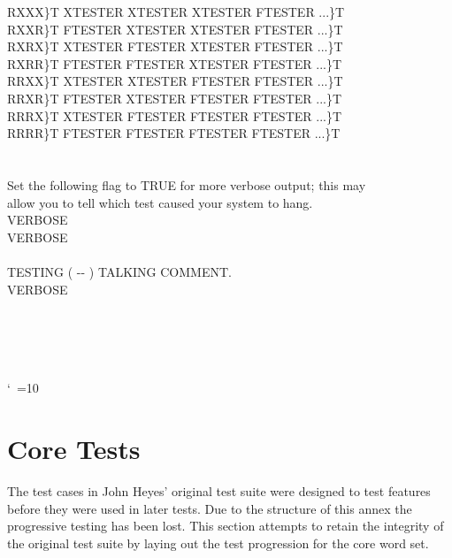 \begin{tt}
\tab \word{:} RXXX\}T XTESTER XTESTER XTESTER FTESTER ...\}T \word{;} \\
\tab \word{:} RXXR\}T FTESTER XTESTER XTESTER FTESTER ...\}T \word{;} \\
\tab \word{:} RXRX\}T XTESTER FTESTER XTESTER FTESTER ...\}T \word{;} \\
\tab \word{:} RXRR\}T FTESTER FTESTER XTESTER FTESTER ...\}T \word{;} \\
\tab \word{:} RRXX\}T XTESTER XTESTER FTESTER FTESTER ...\}T \word{;} \\
\tab \word{:} RRXR\}T FTESTER XTESTER FTESTER FTESTER ...\}T \word{;} \\
\tab \word{:} RRRX\}T XTESTER FTESTER FTESTER FTESTER ...\}T \word{;} \\
\tab \word{:} RRRR\}T FTESTER FTESTER FTESTER FTESTER ...\}T \word{;} \\
\word[tools]{[THEN]} \\
\\
 Set the following flag to TRUE for more verbose output; this may \\
 allow you to tell which test caused your system to hang. \\
 VERBOSE \\\mbox{}
   VERBOSE \word{!} \\
 \\
\word{:} TESTING	 ( -{}- ) TALKING COMMENT. \\
\tab {} VERBOSE  \\
\tab {}       \word{!} \\
\tab {}  \word{!}  \\
\tab {} \word{;} \\
\\
 \word{!}
\end{tt}
\nonfrenchspacing
\catcode`\ =10

\section{Core Tests}

The test cases in John Heyes' original test suite were designed to
test features before they were used in later tests.  Due to the
structure of this annex the progressive testing has been lost.  This
section attempts to retain the integrity of the original test suite
by laying out the test progression for the core word set.

